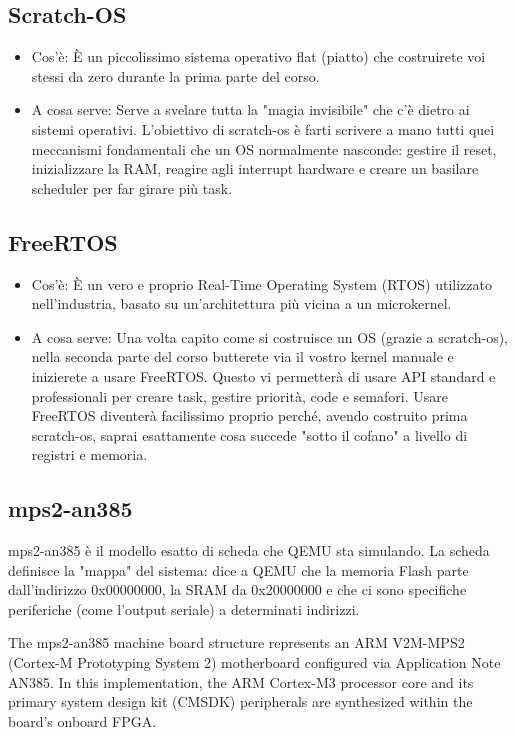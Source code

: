 \subsection{Scratch-OS}
\begin{itemize}
    \item Cos'è: È un piccolissimo sistema operativo flat (piatto) che costruirete voi stessi da zero durante la prima parte del corso.  
    
    \item A cosa serve: Serve a svelare tutta la "magia invisibile" che c'è dietro ai sistemi operativi. L'obiettivo di scratch-os è farti scrivere a mano tutti quei meccanismi fondamentali che un OS normalmente nasconde: gestire il reset, inizializzare la RAM, reagire agli interrupt hardware e creare un basilare scheduler per far girare più task. 
\end{itemize}

\subsection{FreeRTOS}
\begin{itemize}
    \item Cos'è: È un vero e proprio Real-Time Operating System (RTOS) utilizzato nell'industria, basato su un'architettura più vicina a un microkernel.   
    
    \item A cosa serve: Una volta capito come si costruisce un OS (grazie a scratch-os), nella seconda parte del corso butterete via il vostro kernel manuale e inizierete a usare FreeRTOS. Questo vi permetterà di usare API standard e professionali per creare task, gestire priorità, code e semafori. Usare FreeRTOS diventerà facilissimo proprio perché, avendo costruito prima scratch-os, saprai esattamente cosa succede "sotto il cofano" a livello di registri e memoria. 
\end{itemize}

\subsection{mps2-an385}
mps2-an385 è il modello esatto di scheda che QEMU sta simulando. La scheda definisce la "mappa" del sistema: dice a QEMU che la memoria Flash parte dall'indirizzo 0x00000000, la SRAM da 0x20000000 e che ci sono specifiche periferiche (come l'output seriale) a determinati indirizzi.

The mps2-an385 machine board structure represents an ARM V2M-MPS2 (Cortex-M Prototyping System 2) motherboard configured via Application Note AN385. In this implementation, the ARM Cortex-M3 processor core and its primary system design kit (CMSDK) peripherals are synthesized within the board's onboard FPGA.

